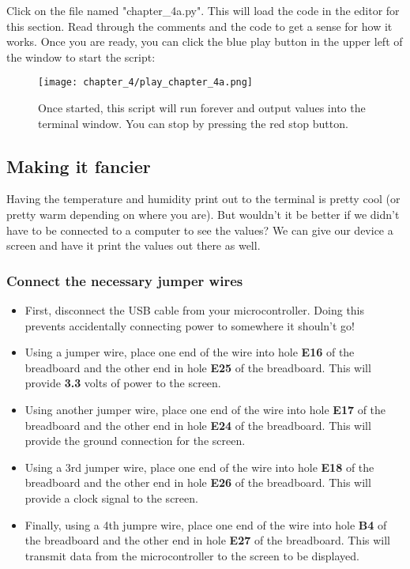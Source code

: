 Click on the file named "chapter\_4a.py". This will load the code in the editor for this section. Read through the comments and the code to get a sense for how it works. Once you are ready, you can click the blue play button in the upper left of the window to start the script:
\begin{figure}[H]
    \centering
    \texttt{[image: chapter\_4/play\_chapter\_4a.png]}
    \caption{Once started, this script will run forever and output values into the terminal window. You can stop by pressing the red stop button.}
\end{figure}

\subsection{Making it fancier}
Having the temperature and humidity print out to the terminal is pretty cool (or pretty warm depending on where you are). But wouldn't it be better if we didn't have to be connected to a computer to see the values? We can give our device a screen and have it print the values out there as well.

\subsubsection{Connect the necessary jumper wires}
\begin{itemize}
    \item First, disconnect the USB cable from your microcontroller. Doing this prevents accidentally connecting power to somewhere it shouln't go!
    \item Using a jumper wire, place one end of the wire into hole \textbf{E16} of the breadboard and the other end in hole \textbf{E25} of the breadboard. This will provide \textbf{3.3} volts of power to the screen.
    \item Using another jumper wire, place one end of the wire into hole \textbf{E17} of the breadboard and the other end in hole \textbf{E24} of the breadboard. This will provide the ground connection for the screen.
    \item Using a 3rd jumper wire, place one end of the wire into hole \textbf{E18} of the breadboard and the other end in hole \textbf{E26} of the breadboard. This will provide a clock signal to the screen.
    \item Finally, using a 4th jumpre wire, place one end of the wire into hole \textbf{B4} of the breadboard and the other end in hole \textbf{E27} of the breadboard. This will transmit data from the microcontroller to the screen to be displayed.
\end{itemize}

